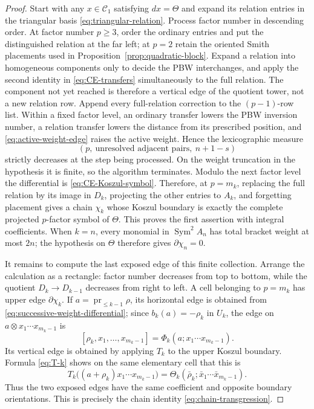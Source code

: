 \documentclass[11pt]{amsart}
\theoremstyle{remark}
\newcommand{\Sym}{\operatorname{Sym}}
\newcommand{\pr}{\operatorname{pr}}
\begin{document}
\begin{proof}
Start with any $x\in\mathcal C_1$ satisfying $dx=\Theta$ and expand its
relation entries in the triangular basis
\eqref{eq:triangular-relation}.  Process
factor number in descending order.  At factor number $p\geq3$, order
the ordinary entries and put the distinguished relation at the far
left; at $p=2$ retain the oriented Smith placements used in
Proposition~\ref{prop:quadratic-block}.  Expand a relation into
homogeneous components only to decide the PBW interchanges, and apply
the second identity in \eqref{eq:CE-transfers} simultaneously to the
full relation.  The component not yet reached is therefore a vertical
edge of the quotient tower, not a new relation row.  Append every
full-relation correction to the $(p-1)$-row list.  Within a fixed
factor level, an ordinary transfer lowers the PBW inversion number, a
relation transfer lowers the distance from its prescribed position,
and \eqref{eq:active-weight-edge} raises the active weight.  Hence the
lexicographic measure
\[
 (p,\ \text{unresolved adjacent pairs},\ n+1-s)
\]
strictly decreases at the step being processed.  On the weight
truncation in the hypothesis it is finite, so the algorithm terminates.
Modulo the next factor level the differential is
\eqref{eq:CE-Koszul-symbol}.  Therefore, at $p=m_k$, replacing the full
relation by its image in $D_k$, projecting the other entries to $A_k$,
and forgetting placement gives a chain $\chi_k$ whose Koszul boundary is
exactly the complete projected $p$-factor symbol of $\Theta$.  This
proves the first assertion with integral coefficients.  When $k=n$,
every monomial in $\Sym^2A_n$ has total bracket weight at most $2n$;
the hypothesis on $\Theta$ therefore gives $\partial\chi_n=0$.

It remains to compute the last exposed edge of this finite collection.
Arrange the calculation as a rectangle: factor number decreases from
top to bottom, while the quotient $D_k\to D_{k-1}$ decreases from right
to left.  A cell belonging to $p=m_k$ has upper edge
$\partial\chi_k$.  If $a=\pr_{\leq k-1}\rho$, its horizontal edge is
obtained from \eqref{eq:successive-weight-differential}; since
$b_k(a)=-\rho_k$ in $U_k$, the edge on
$a\otimes x_1\cdots x_{m_k-1}$ is
\begin{equation}\label{eq:cell-horizontal-edge}
 [\rho_k,x_1,\ldots,x_{m_k-1}]
 =\Phi_k(a;x_1\cdots x_{m_k-1}).
\end{equation}
Its vertical edge is obtained by applying $T_k$ to the upper Koszul
boundary.  Formula \eqref{eq:T-k} shows on the same elementary cell that
this is
\begin{equation}\label{eq:cell-vertical-edge}
 T_k\bigl((a+\rho_k)x_1\cdots x_{m_k-1}\bigr)
 =\Theta_k(\bar\rho_k;\bar x_1\cdots\bar x_{m_k-1}).
\end{equation}
Thus the two exposed edges have the same coefficient and opposite
boundary orientations.  This is precisely the chain identity
\eqref{eq:chain-transgression}.


\end{proof}
\end{document}
